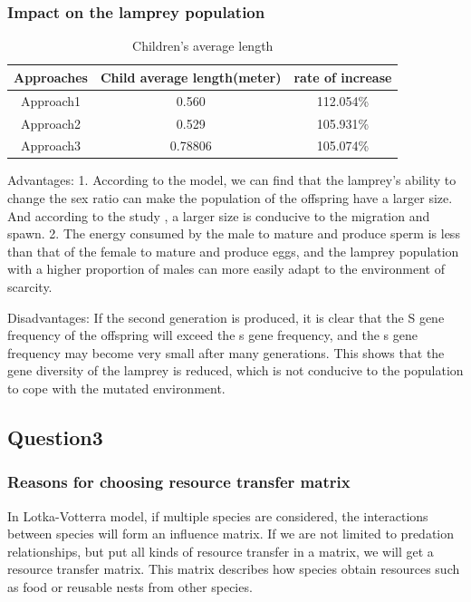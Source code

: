 \documentclass[12pt]{article}
\begin{document}
\subsubsection{Impact on the lamprey population }
\begin{table}
	\centering
	\begin{tabular}{ |c |c |c|}
		\hline
		Approaches & Child average length(meter) & rate of increase\\
		\hline
		Approach1  & 0.560  &       112.054\%           \\
		\hline
		Approach2  & 0.529   &      105.931\%           \\
		\hline
		Approach3  & 0.78806     &   105.074\%             \\
		\hline
	\end{tabular}

	\caption{Children's average length}
\end{table}

Advantages: 1. According to the model, we can find that the lamprey's ability to change
the sex ratio can make the population of the offspring have a larger size. And according
to the study \cite{hess_genes_2014}, a larger size is conducive to the migration and
spawn. 2. The energy consumed by the male to mature and produce sperm is less than that of
the female to mature and produce eggs, and the lamprey population with a higher proportion of
males can more easily adapt to the environment of scarcity.

Disadvantages: If the second generation is produced, it is clear that the S gene frequency
of the offspring will exceed the s gene frequency, and the s gene frequency may become
very small after many generations. This shows that the gene diversity of the lamprey
is reduced, which is not conducive to the population to cope with the mutated environment.

\subsection{Question3}
\subsubsection{Reasons for choosing resource transfer matrix}
In Lotka-Votterra model, if multiple species are considered, the interactions between species
will form an influence matrix. If we are not limited to predation relationships, but put all
kinds of resource transfer in a matrix, we will get a resource transfer matrix. This matrix
describes how species obtain resources such as food or reusable nests from other species.
\end{document}
